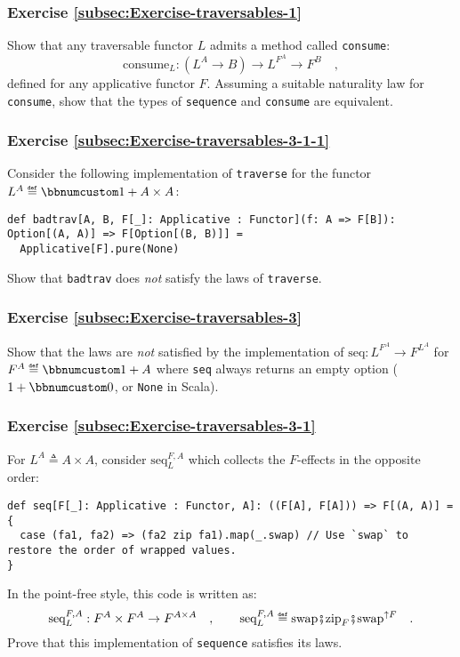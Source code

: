 \subsubsection{Exercise \label{subsec:Exercise-traversables-1}\ref{subsec:Exercise-traversables-1}}

Show that any traversable functor $L$ admits a method called \lstinline!consume!:
\[
\text{consume}_{L}:(L^{A}\rightarrow B)\rightarrow L^{F^{A}}\rightarrow F^{B}\quad,
\]
defined for any applicative functor $F$. Assuming a suitable naturality
law for \lstinline!consume!, show that the types of \lstinline!sequence!
and \lstinline!consume! are equivalent.

\subsubsection{Exercise \label{subsec:Exercise-traversables-3-1-1}\ref{subsec:Exercise-traversables-3-1-1}}

Consider the following implementation of \lstinline!traverse! for
the functor $L^{A}\triangleq\bbnum 1+A\times A$:
\begin{lstlisting}
def badtrav[A, B, F[_]: Applicative : Functor](f: A => F[B]): Option[(A, A)] => F[Option[(B, B)]] =
  Applicative[F].pure(None)
\end{lstlisting}
Show that \lstinline!badtrav! does \emph{not} satisfy the laws of
\lstinline!traverse!.

\subsubsection{Exercise \label{subsec:Exercise-traversables-3}\ref{subsec:Exercise-traversables-3}}

Show that the laws are \emph{not} satisfied by the implementation
of $\text{seq}:L^{F^{A}}\rightarrow F^{L^{A}}$ for $F^{A}\triangleq\bbnum 1+A$
where \lstinline!seq! always returns an empty option ($1+\bbnum 0$,
or \lstinline!None! in Scala).

\subsubsection{Exercise \label{subsec:Exercise-traversables-3-1}\ref{subsec:Exercise-traversables-3-1}}

For $L^{A}\triangleq A\times A$, consider $\text{seq}_{L}^{F,A}$
which collects the $F$-effects in the opposite order:
\begin{lstlisting}
def seq[F[_]: Applicative : Functor, A]: ((F[A], F[A])) => F[(A, A)] = {
  case (fa1, fa2) => (fa2 zip fa1).map(_.swap) // Use `swap` to restore the order of wrapped values.
}
\end{lstlisting}
In the point-free style, this code is written as:
\[
\text{seq}_{L}^{F,A}:F^{A}\times F^{A}\rightarrow F^{A\times A}\quad,\quad\quad\text{seq}_{L}^{F,A}\triangleq\text{swap}\bef\text{zip}_{F}\bef\text{swap}^{\uparrow F}\quad.
\]
Prove that this implementation of \lstinline!sequence! satisfies
its laws.

